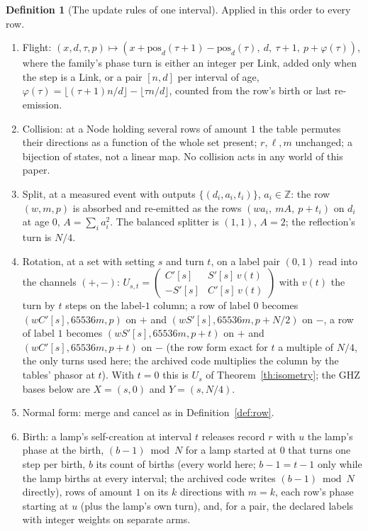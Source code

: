 \documentclass[11pt]{article}
\theoremstyle{definition}
\newtheorem{definition}{Definition}
\newcommand{\Z}{\mathbb{Z}}
\begin{document}
\begin{definition}[The update rules of one interval]\label{def:rules}
Applied in this order to every row.
\begin{enumerate}
\item[F] Flight: $(x, d, \tau, p) \mapsto (x + \mathrm{pos}_d(\tau+1) -
\mathrm{pos}_d(\tau),\ d,\ \tau + 1,\ p + \varphi(\tau))$, where the
family's phase turn is either an integer per Link, added only when the
step is a Link, or a pair $[n, d]$ per interval of age,
$\varphi(\tau) = \lfloor (\tau+1) n/d \rfloor - \lfloor \tau n/d \rfloor$,
counted from the row's birth or last re-emission.
\item[C] Collision: at a Node holding several rows of amount $1$ the
table permutes their directions as a function of the whole set present;
$r, \ell, m$ unchanged; a bijection of states, not a linear map. No
collision acts in any world of this paper.
\item[S] Split, at a measured event with outputs $\{(d_i, a_i, t_i)\}$,
$a_i \in \Z$: the row $(w, m, p)$ is absorbed and re-emitted as the rows
$(w a_i,\ m A,\ p + t_i)$ on $d_i$ at age $0$, $A = \sum_i a_i^2$. The
balanced splitter is $(1, 1)$, $A = 2$; the reflection's turn is $N/4$.
\item[R] Rotation, at a set with setting $s$ and turn $t$, on a label
pair $(0, 1)$ read into the channels $(+, -)$:
$U_{s,t} = \begin{pmatrix} C'[s] & S'[s]\,v(t) \\ -S'[s] & C'[s]\,v(t)\end{pmatrix}$
with $v(t)$ the turn by $t$ steps on the label-$1$ column; a row of
label $0$ becomes $(wC'[s], 65536m, p)$ on $+$ and $(wS'[s], 65536m,
p + N/2)$ on $-$, a row of label $1$ becomes $(wS'[s], 65536m, p + t)$ on
$+$ and $(wC'[s], 65536m, p + t)$ on $-$ (the row form exact for $t$ a
multiple of $N/4$, the only turns used here; the archived code multiplies
the column by the tables' phasor at $t$). With $t = 0$ this is $U_s$ of
Theorem~\ref{th:isometry}; the GHZ bases below are $X = (s, 0)$ and
$Y = (s, N/4)$.
\item[M] Normal form: merge and cancel as in Definition~\ref{def:row}.
\item[B] Birth: a lamp's self-creation at interval $t$ releases record $r$
with $u$ the lamp's phase at the birth, $(b - 1) \bmod N$ for a lamp
started at $0$ that turns one step per birth, $b$ its count of births
(every world here; $b - 1 = t - 1$ only while the lamp births at every
interval; the archived code writes $(b - 1) \bmod N$ directly), rows of
amount $1$ on its $k$
directions with $m = k$, each row's phase starting at $u$ (plus the
lamp's own turn), and, for a pair, the declared labels with integer
weights on separate arms.
\end{enumerate}
\end{definition}
\end{document}
